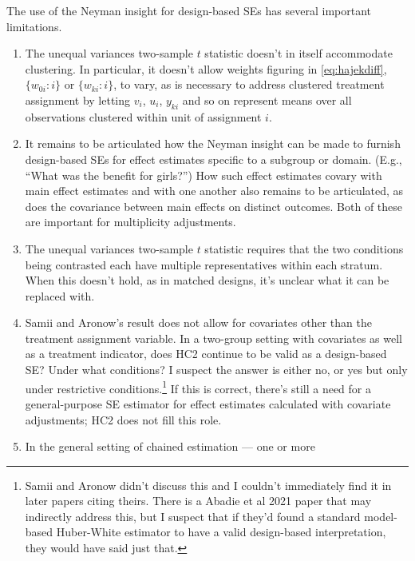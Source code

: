 The use of the Neyman insight for design-based SEs
has several important limitations.

\begin{enumerate}
\def\labelenumi{\arabic{enumi}.}
\item \label{it:prob-noweights}
  The unequal variances two-sample \(t\) statistic doesn't in itself accommodate
  clustering.  In particular, it doesn't allow weights figuring in \eqref{eq:hajekdiff}, 
$\{w_{0i} :i\}$ or  $\{w_{ki} :i\}$, to vary, as is necessary
to address clustered treatment assignment by letting $v_{i}$, $u_{i}$,
$y_{ki}$ and so on
represent means over all observations clustered within unit of
assignment $i$. 
\item \label{it:moderators-multiple-outcomes}  It remains to be
  articulated how the Neyman insight can be made to furnish design-based SEs
  for effect estimates specific to a subgroup or domain. (E.g., ``What was
  the benefit for girls?'') How such
  effect estimates covary with main effect
  estimates and with one another also remains to be articulated, as
  does the covariance between main effects on distinct outcomes. Both
  of these are important for multiplicity adjustments.   
\item \label{it:prob-multreps}
  The unequal variances two-sample \(t\) statistic requires that the two
  conditions being contrasted each have multiple representatives within
  each stratum. When this doesn't hold, as in matched designs, it's
  unclear what it can be replaced with.
\item \label{it:prob-covars}
  Samii and Aronow's result does not allow for covariates other than the
  treatment assignment variable. In a two-group setting with covariates
  as well as a treatment indicator, does HC2 continue to be valid as a
  design-based SE? Under what conditions? I suspect the answer is either
  no, or yes but only under restrictive conditions.\footnote{Samii and
    Aronow didn't discuss this and I couldn't immediately find it in
    later papers citing theirs. There is a Abadie et al 2021 paper that
    may indirectly address this, but I suspect that if they'd found a
    standard model-based Huber-White estimator to have a valid
    design-based interpretation, they would have said just that.}
  If this is correct,  there's still a need for a general-purpose SE
  estimator for effect estimates calculated with
covariate adjustments; HC2 does not fill this role.  
\item \label{it:prob-differentstatuses}
  In the general setting of chained estimation ---  one or more

\end{enumerate}

